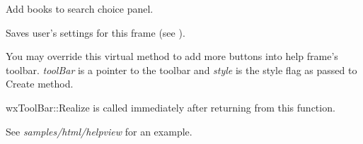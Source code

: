 Add books to search choice panel.

\label{wxhtmlhelpframewritecustomization}


Saves user's settings for this frame (see ).

\label{wxhtmlhelpframeaddtoolbarbuttons}


You may override this virtual method to add more buttons into help frame's
toolbar. {\it toolBar} is a pointer to the toolbar and {\it style} is the style
flag as passed to Create method.

wxToolBar::Realize is called immediately after returning from this function.

See {\it samples/html/helpview} for an example.

